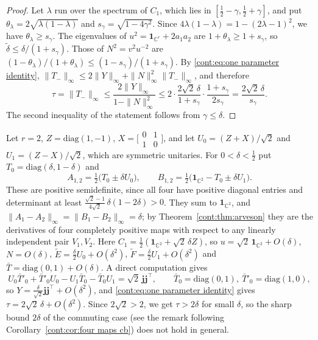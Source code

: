 \begin{proof}
Let $\lambda$ run over the spectrum of $C_1$, which lies in $[\frac12-\gamma,\frac12+\gamma]$, and put $\theta_\lambda=2\sqrt{\lambda(1-\lambda)}$ and $s_\gamma=\sqrt{1-4\gamma^2}$. Since $4\lambda(1-\lambda)=1-(2\lambda-1)^2$, we have $\theta_\lambda\geq s_\gamma$. The eigenvalues of $u^2=\mathbf{1}_{\mathbb{C}^r}+2a_1a_2$ are $1+\theta_\lambda\geq1+s_\gamma$, so $\tilde\delta\leq\delta/(1+s_\gamma)$. Those of $N^2=v^2u^{-2}$ are $(1-\theta_\lambda)/(1+\theta_\lambda)\leq(1-s_\gamma)/(1+s_\gamma)$. By \eqref{cont:eq:one parameter identity}, $\|T_-\|_\infty\leq2\|Y\|_\infty+\|N\|_\infty^2\|T_-\|_\infty$, and therefore
\[
\tau=\|T_-\|_\infty\leq\frac{2\|Y\|_\infty}{1-\|N\|_\infty^2}\leq2\cdot\frac{2\sqrt2\,\delta}{1+s_\gamma}\cdot\frac{1+s_\gamma}{2s_\gamma}=\frac{2\sqrt2\,\delta}{s_\gamma}.
\]
The second inequality of the statement follows from $\gamma\leq\delta$.
\end{proof}

\begin{example}\label{cont:ex:one parameter sharp}
Let $r=2$, $Z=\mathrm{diag}(1,-1)$, $X=\big[\begin{smallmatrix}0&1\\1&0\end{smallmatrix}\big]$, and let $U_0=(Z+X)/\sqrt2$ and $U_1=(Z-X)/\sqrt2$, which are symmetric unitaries. For $0<\delta<\frac12$ put $T_0=\mathrm{diag}(\delta,1-\delta)$ and
\[
A_{1,2}=\tfrac12\big(T_0\pm\delta U_0\big),\qquad B_{1,2}=\tfrac12\big(\mathbf{1}_{\mathbb{C}^2}-T_0\pm\delta U_1\big).
\]
These are positive semidefinite, since all four have positive diagonal entries and determinant at least $\frac{\sqrt2-1}{4\sqrt2}\,\delta(1-2\delta)>0$. They sum to $\mathbf{1}_{\mathbb{C}^2}$, and $\|A_1-A_2\|_\infty=\|B_1-B_2\|_\infty=\delta$; by Theorem~\ref{cont:thm:arveson} they are the derivatives of four completely positive maps with respect to any linearly independent pair $V_1,V_2$. Here $C_1=\frac12(\mathbf{1}_{\mathbb{C}^2}+\sqrt2\,\delta Z)$, so $u=\sqrt2\,\mathbf{1}_{\mathbb{C}^2}+O(\delta)$, $N=O(\delta)$, $\tilde E=\frac\delta2U_0+O(\delta^2)$, $\tilde F=\frac\delta2U_1+O(\delta^2)$ and $\bar T=\mathrm{diag}(0,1)+O(\delta)$. A direct computation gives
\[
U_0\bar T'_0+\bar T'_0U_0-U_1\bar T_0-\bar T_0U_1=\sqrt2\,\mathbf{j}\mathbf{j}^\top,\qquad\bar T_0=\mathrm{diag}(0,1),\ \bar T'_0=\mathrm{diag}(1,0),
\]
so $Y=\frac{\delta}{\sqrt2}\mathbf{j}\mathbf{j}^\top+O(\delta^2)$, and \eqref{cont:eq:one parameter identity} gives $\tau=2\sqrt2\,\delta+O(\delta^2)$. Since $2\sqrt2>2$, we get $\tau>2\delta$ for small $\delta$, so the sharp bound $2\delta$ of the commuting case (see the remark following Corollary~\ref{cont:cor:four maps cb}) does not hold in general.
\end{example}

